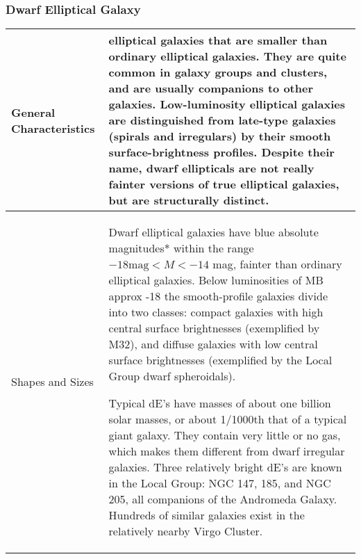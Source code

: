 \subsubsection{Dwarf Elliptical Galaxy}
\begin{longtabu} to 
\hline
General Characteristics &
 elliptical galaxies that are smaller than ordinary elliptical galaxies. They are quite common in galaxy groups and clusters, and are usually companions to other galaxies. Low-luminosity elliptical galaxies are distinguished from late-type galaxies (spirals and irregulars) by their smooth surface-brightness profiles.
Despite their name, dwarf ellipticals are not really fainter versions of true elliptical galaxies, but are structurally distinct.
 \\
 \hline
 Shapes and Sizes &
 Dwarf elliptical galaxies have blue \gls{absolute magnitude}s* within the range $-18 \textrm{mag} < M < -14$ mag, fainter than ordinary elliptical galaxies. Below luminosities of MB approx -18 the smooth-profile galaxies divide into two classes: compact galaxies with high central surface brightnesses (exemplified by M32), and diffuse galaxies with low central surface brightnesses (exemplified by the Local Group dwarf spheroidals).
 
 Typical dE's have masses of about one billion solar masses, or about 1/1000th that of a typical giant galaxy. They contain very little or no gas, which makes them different from dwarf irregular galaxies. Three relatively bright dE's are known in the Local Group: NGC 147, 185, and NGC 205, all companions of the Andromeda Galaxy. Hundreds of similar galaxies exist in the relatively nearby Virgo Cluster.
 

\end{longtabu}
